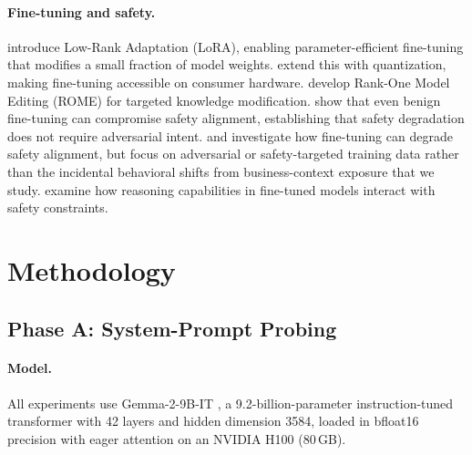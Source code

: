 \documentclass[11pt,a4paper]{article}
\newcommand{\gemma}{Gemma-2-9B-IT}
\begin{document}
\paragraph{Fine-tuning and safety.}
\citet{hu2021lora} introduce Low-Rank Adaptation (LoRA), enabling
parameter-efficient fine-tuning that modifies a small fraction of model
weights. \citet{dettmers2023qlora} extend this with quantization, making
fine-tuning accessible on consumer hardware. \citet{meng2022locating} develop
Rank-One Model Editing (ROME) for targeted knowledge modification.
\citet{qi2023finetuning} show that even benign fine-tuning can compromise
safety alignment, establishing that safety degradation does not require
adversarial intent. \citet{abdelnabi2024you} and \citet{soligo2024model} investigate how
fine-tuning can degrade safety alignment, but focus on adversarial or
safety-targeted training data rather than the incidental behavioral shifts
from business-context exposure that we study. \citet{chen2024reasoning}
examine how reasoning capabilities in fine-tuned models interact with
safety constraints.

\section{Methodology}
\label{sec:method}

\subsection{Phase A: System-Prompt Probing}
\label{sec:method_phase_a}

\paragraph{Model.} All experiments use \gemma{} \citep[Google
DeepMind;][]{gemma2024}, a 9.2-billion-parameter instruction-tuned
transformer with 42 layers and hidden dimension 3584, loaded in bfloat16
precision with eager attention on an NVIDIA H100 (80\,GB).
\end{document}
